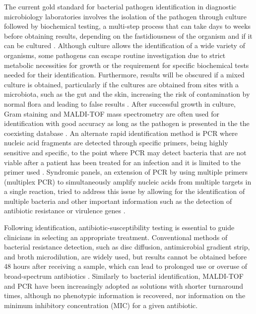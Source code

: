 The current gold standard for bacterial pathogen identification in diagnostic microbiology laboratories involves the isolation of the pathogen through culture followed by biochemical testing, a multi-step process that can take days to weeks before obtaining results, depending on the fastidiousness of the organism and if it can be cultured \citep{muhamad_rizal_advantages_2020, giuliano_guide_2019, muhamad_rizal_advantages_2020}. 
Although culture allows the identification of a wide variety of organisms, some pathogens can escape routine investigation due to strict metabolic necessities for growth or the requirement for specific biochemical tests needed for their identification. 
Furthermore, results will be obscured if a mixed culture is obtained, particularly if the cultures are obtained from sites with a microbiota, such as the gut and the skin, increasing the risk of contamination by normal flora and leading to false results \citep{giuliano_guide_2019}. 
After successful growth in culture, Gram staining and MALDI-TOF mass spectrometry are often used for identification with good accuracy as long as the pathogen is presented in the the coexisting database \citep{patel_maldi-tof_2015}. 
An alternate rapid identification method is PCR where nucleic acid fragments are detected through specific primers, being highly sensitive and specific, to the point where PCR may detect bacteria that are not viable after a patient has been treated for an infection and it is limited to the primer used \citep{scerbo_beyond_2016}. 
Syndromic panels, an extension of PCR by using multiple primers (multiplex PCR) to simultaneously amplify nucleic acids from multiple targets in a single reaction, tried to address this issue by allowing for the identification of multiple bacteria and other important information such as the detection of antibiotic resistance or virulence genes \citep{giuliano_guide_2019}.

Following identification, antibiotic-susceptibility testing is essential to guide clinicians in selecting an appropriate treatment. 
Conventional methods of bacterial resistance detection, such as disc diffusion, antimicrobial gradient strip, and broth microdilution, are widely used, but results cannot be obtained before 48 hours after receiving a sample, which can lead to prolonged use or overuse of broad-spectrum antibiotics \citep{benkova_antimicrobial_2020}. 
Similarly to bacterial identification, MALDI-TOF and PCR have been increasingly adopted as solutions with shorter turnaround times, although no phenotypic information is recovered, nor information on the minimum inhibitory concentration (MIC) for a given antibiotic.   


